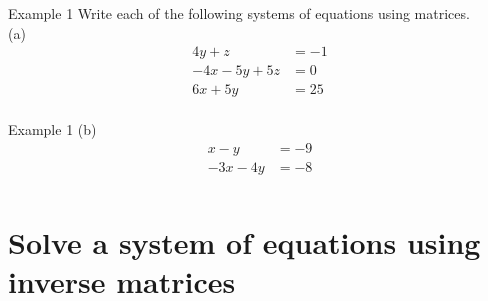 \documentclass[t]{beamer}
\begin{document}
\begin{frame}{Example 1}
Write each of the following systems of equations using matrices.	\newline\\
(a)	\quad
\begin{align*}
4y	+ z &= -1 \\
-4x - 5y + 5z &= 0 \\
6x + 5y &= 25 \\
\end{align*}
\end{frame}

\begin{frame}{Example 1}
(b) \quad 
\begin{align*}
x - y &= -9 \\
-3x - 4y &= -8 \\
\end{align*}
\end{frame}

\section{Solve a system of equations using inverse matrices}
\end{document}
